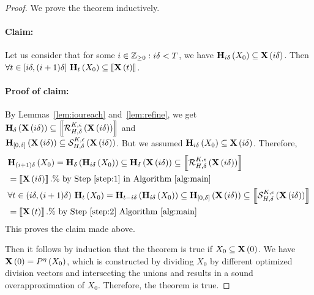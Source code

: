 \begin{proof}
We prove the theorem inductively.

\paragraph{Claim:}  Let us consider that for some
$i\in\mathbb{Z}_{\geq 0}:i\delta<T$, we have
$\mathbf{H}_{i\delta}\left(X_0\right)\subseteq\mathbf{X}\left(i\delta\right)$.  Then $\forall
t\in[i\delta,(i+1)\delta]~\mathbf{H}_{t}\left(X_0\right)\subseteq \left\llbracket{\mathbf{X}\left(t\right)}\right\rrbracket$.

\paragraph{Proof of claim:}
By Lemmas~\ref{lem:ioureach} and~\ref{lem:refine}, we get
$\mathbf{H}_{\delta}\left(\mathbf{X}\left(i\delta\right)\right)\subseteq \left\llbracket{\mathcal{R}_{H,\delta}^{K,\epsilon}\left(\mathbf{X}\left(i\delta\right)\right)}\right\rrbracket$
and\\
$\mathbf{H}_{[0,\delta]}\left(\mathbf{X}\left(i\delta\right)\right)\subseteq \mathcal{S}_{H,\delta}^{K,\epsilon}\left(\mathbf{X}\left(i\delta\right)\right)$.
But we assumed $\mathbf{H}_{i\delta}\left(X_0\right)\subseteq \mathbf{X}\left(i\delta\right)$.
Therefore,
%
\begin{align*}
& \reach{H}{(i+1)\delta}{X_0}
= \reach{H}{\delta}{\reach{H}{i\delta}{X_0}} \subseteq \reach{H}{\delta}{\tr{X}{i\delta}}
\subseteq \ztset{\flow{H}{\delta}{K}{\epsilon}{\tr{X}{i\delta}}}\\
& = \ztset{\tr{X}{i\delta}}.\%~\text{by Step~\ref{step:1} in Algorithm~\ref{alg:main}}\\
%
& \forall t\in(i\delta,(i+1)\delta)~\reach{H}{t}{X_0}
= \reach{H}{t-i\delta}{\reach{H}{i\delta}{X_0}} \subseteq \reach{H}{[0,\delta]}{\tr{X}{i\delta}}
\subseteq \ztset{\ivflow{H}{\delta}{K}{\epsilon}{\tr{X}{i\delta}}}\\
& = \ztset{\tr{X}{t}}. \%~\text{by Step~\ref{step:2} Algorithm~\ref{alg:main}}
\end{align*}
%
This proves the claim made above.

Then it follows by induction that the theorem is true if
$X_0\subseteq \mathbf{X}\left(0\right)$.  We have $\mathbf{X}\left(0\right) = P^{\eta}\left(X_0\right)$,
which is constructed by dividing $X_0$ by different optimized division
vectors and intersecting the unions and results in a sound
overapproximation of $X_0$.  Therefore, the theorem is true.
\end{proof}
%
